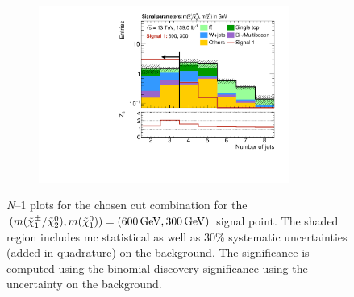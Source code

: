 \begin{figure}
\begin{subfigure}[b]{0.5\linewidth}
	\end{subfigure}\hfill
	\begin{subfigure}[b]{0.5\linewidth}
		\centering\includegraphics[width=0.9\textwidth]{N-1_cut_scan/n1_600_300/nJet30}
	\end{subfigure}

	\caption[\textit{N}--1 plots for the chosen cut combination for the (600, 300) signal point]{\textit{N}--1 plots for the chosen cut combination for the $(m(\charg/\neutr), m(\lsp)) = (\SI{600}{\GeV}, \SI{300}{\GeV})$ signal point. The shaded region includes \gls{mc} statistical as well as 30\% systematic uncertainties (added in quadrature) on the background. The significance is computed using the binomial discovery significance using the uncertainty on the background.}
	\label{fig:results_n1_600_300}
\end{figure}

